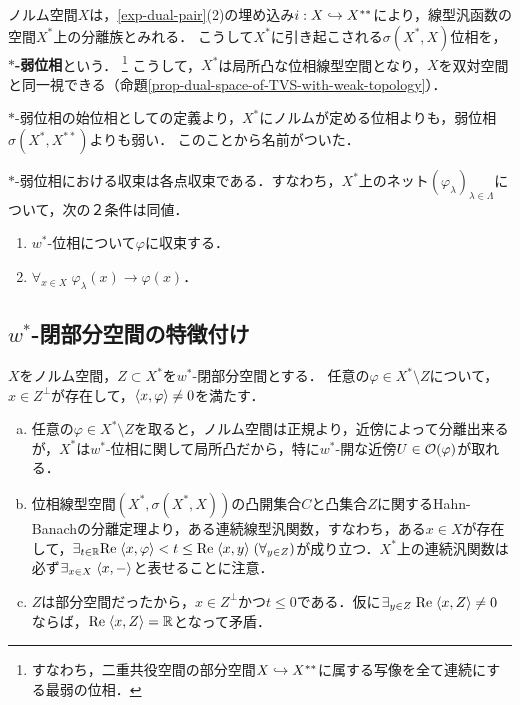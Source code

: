 \documentclass[uplatex,dvipdfmx]{jsreport}
\begin{document}
\begin{definition}\label{def-weak-star-topology}
    ノルム空間$X$は，\ref{exp-dual-pair}(2)の埋め込み$i:X\hookrightarrow X^{**}$により，線型汎函数の空間$X^*$上の分離族とみれる．
    こうして$X^*$に引き起こされる$\sigma(X^*,X)$位相を，\textbf{$*$-弱位相}という．
    \footnote{すなわち，二重共役空間の部分空間$X\hookrightarrow X^{**}$に属する写像を全て連続にする最弱の位相．}
    こうして，$X^*$は局所凸な位相線型空間となり，$X$を双対空間と同一視できる（命題\ref{prop-dual-space-of-TVS-with-weak-topology}）．
\end{definition}
\begin{remarks}
    $*$-弱位相の始位相としての定義より，$X^*$にノルムが定める位相よりも，弱位相$\sigma(X^*,X^{**})$よりも弱い．
    このことから名前がついた．
\end{remarks}

\begin{lemma}[$*$-弱収束は各点収束]\label{lemma-characterization-of-convergence-in-w*topology}
    $*$-弱位相における収束は各点収束である．すなわち，$X^*$上のネット$(\varphi_\lambda)_{\lambda\in\Lambda}$について，次の２条件は同値．
    \begin{enumerate}
        \item $w^*$-位相について$\varphi$に収束する．
        \item $\forall_{x\in X}\;\varphi_\lambda(x)\to\varphi(x)$．
    \end{enumerate}
\end{lemma}

\subsection{$w^*$-閉部分空間の特徴付け}

\begin{proposition}
    $X$をノルム空間，$Z\subset X^*$を$w^*$-閉部分空間とする．
    任意の$\varphi\in X^*\setminus Z$について，$x\in Z^\perp$が存在して，$\langle x,\varphi\rangle\ne 0$を満たす．
\end{proposition}
\begin{Proof}\mbox{}
    \begin{enumerate}[(a)]
        \item 任意の$\varphi\in X^*\setminus Z$を取ると，ノルム空間は正規より，近傍によって分離出来るが，$X^*$は$w^*$-位相に関して局所凸だから，特に$w^*$-開な近傍$U\in\mathcal{O}(\varphi)$が取れる．
        \item 位相線型空間$(X^*,\sigma(X^*,X))$の凸開集合$C$と凸集合$Z$に関するHahn-Banachの分離定理より，ある連続線型汎関数，すなわち，ある$x\in X$が存在して，$\exists_{t\in\mathbb{R}}\mathrm{Re}\;\langle x,\varphi\rangle<t\le\mathrm{Re}\;\langle x,y\rangle\;(\forall_{y\in Z})$が成り立つ．$X^*$上の連続汎関数は必ず$\exists_{x\in X}\;\langle x,-\rangle$と表せることに注意．
        \item $Z$は部分空間だったから，$x\in Z^\perp$かつ$t\le0$である．仮に$\exists_{y\in Z}\;\mathrm{Re}\;\langle x,Z\rangle\ne0$ならば，$\mathrm{Re}\;\langle x,Z\rangle=\mathbb{R}$となって矛盾．
    \end{enumerate}
\end{Proof}
\end{document}

